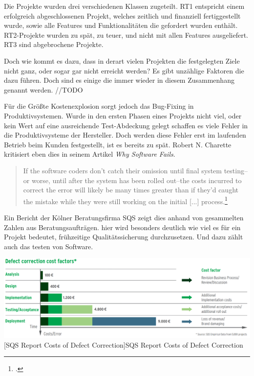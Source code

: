 \documentclass[12pt,a4paper,bibliography=totocnumbered,listof=totocnumbered]{scrartcl}
\begin{document}
Die Projekte wurden drei verschiedenen Klassen zugeteilt. RT1 entspricht einem erfolgreich abgeschlossenen Projekt, welches zeitlich und finanziell fertiggestellt wurde, sowie alle Features und Funktionalitäten die gefordert wurden enthält. RT2-Projekte wurden zu spät, zu teuer, und nicht mit allen Features ausgeliefert. RT3 sind abgebrochene Projekte.

Doch wie kommt es dazu, dass in derart vielen Projekten die festgelegten Ziele nicht ganz, oder sogar gar nicht erreicht werden? Es gibt unzählige Faktoren die dazu führen. Doch sind es einige die immer wieder in diesem Zusammenhang genannt werden. //TODO

Für die Größte Kostenexplosion sorgt jedoch das Bug-Fixing in Produktivsystemen. Wurde in den ersten Phasen eines Projekts nicht viel, oder kein Wert auf eine ausreichende Test-Abdeckung gelegt schaffen es viele Fehler in die Produktivsysteme der Hersteller. Doch werden diese Fehler erst im laufenden Betrieb beim Kunden festgestellt, ist es bereits zu spät. Robert N. Charette kritisiert eben dies in seinem Artikel \textit{Why Software Fails}.

\begin{quote}
	\begin{itshape}
	If the software coders don't catch their omission until final system testing--or worse, until after the system has been rolled out--the costs incurred to correct the error will likely be many times greater than if they'd caught the mistake while they were still working on the initial [...] process.\footcite{charette}
	\end{itshape}
\end{quote}

Ein Bericht der Kölner Beratungsfirma SQS zeigt dies anhand von gesammelten Zahlen aus Beratungsaufträgen. hier wird besonders deutlich wie viel es für ein Projekt bedeutet, frühzeitige Qualitätssicherung durchzusetzen. Und dazu zählt auch das testen von Software.

\vspace{1em}
\begin{minipage}{\linewidth}
	\centering
	\includegraphics[width=0.9\linewidth]{images/img_sqs-defect-correction.PNG}
	[SQS Report Costs of Defect Correction]{SQS Report Costs of Defect Correction \footnotemark}
	\label{fig:img_sqs-defect-correction}
\end{minipage}
\end{document}
